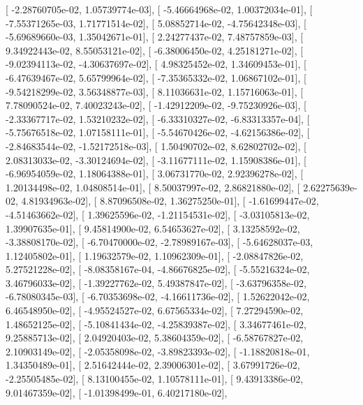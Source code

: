 \documentclass{article}
\begin{document}
       [ -2.28760705e-02,   1.05739774e-03],
       [ -5.46664968e-02,   1.00372034e-01],
       [ -7.55371265e-03,   1.71771514e-02],
       [  5.08852714e-02,  -4.75642348e-03],
       [ -5.69689660e-03,   1.35042671e-01],
       [  2.24277437e-02,   7.48757859e-03],
       [  9.34922443e-02,   8.55053121e-02],
       [ -6.38006450e-02,   4.25181271e-02],
       [ -9.02394113e-02,  -4.30637697e-02],
       [  4.98325452e-02,   1.34609453e-01],
       [ -6.47639467e-02,   5.65799964e-02],
       [ -7.35365332e-02,   1.06867102e-01],
       [ -9.54218299e-02,   3.56348877e-03],
       [  8.11036631e-02,   1.15716063e-01],
       [  7.78090524e-02,   7.40023243e-02],
       [ -1.42912209e-02,  -9.75230926e-03],
       [ -2.33367717e-02,   1.53210232e-02],
       [ -6.33310327e-02,  -6.83313357e-04],
       [ -5.75676518e-02,   1.07158111e-01],
       [ -5.54670426e-02,  -4.62156386e-02],
       [ -2.84683544e-02,  -1.52172518e-03],
       [  1.50490702e-02,   8.62802702e-02],
       [  2.08313033e-02,  -3.30124694e-02],
       [ -3.11677111e-02,   1.15908386e-01],
       [ -6.96954059e-02,   1.18064388e-01],
       [  3.06731770e-02,   2.92396278e-02],
       [  1.20134498e-02,   1.04808514e-01],
       [  8.50037997e-02,   2.86821880e-02],
       [  2.62275639e-02,   4.81934963e-02],
       [  8.87096508e-02,   1.36275250e-01],
       [ -1.61699447e-02,  -4.51463662e-02],
       [  1.39625596e-02,  -1.21154531e-02],
       [ -3.03105813e-02,   1.39907635e-01],
       [  9.45814900e-02,   6.54653627e-02],
       [  3.13258592e-02,  -3.38808170e-02],
       [ -6.70470000e-02,  -2.78989167e-03],
       [ -5.64628037e-03,   1.12405802e-01],
       [  1.19632579e-02,   1.10962309e-01],
       [ -2.08847826e-02,   5.27521228e-02],
       [ -8.08358167e-04,  -4.86676825e-02],
       [ -5.55216324e-02,   3.46796033e-02],
       [ -1.39227762e-02,   5.49387847e-02],
       [ -3.63796358e-02,  -6.78080345e-03],
       [ -6.70353698e-02,  -4.16611736e-02],
       [  1.52622042e-02,   6.46548950e-02],
       [ -4.95524527e-02,   6.67565334e-02],
       [  7.27294590e-02,   1.48652125e-02],
       [ -5.10841434e-02,  -4.25839387e-02],
       [  3.34677461e-02,   9.25885713e-02],
       [  2.04920403e-02,   5.38604359e-02],
       [ -6.58767827e-02,   2.10903149e-02],
       [ -2.05358098e-02,  -3.89823393e-02],
       [ -1.18820818e-01,   1.34350489e-01],
       [  2.51642444e-02,   2.39006301e-02],
       [  3.67991726e-02,  -2.25505485e-02],
       [  8.13100455e-02,   1.10578111e-01],
       [  9.43913386e-02,   9.01467359e-02],
       [ -1.01398499e-01,   6.40217180e-02],
\end{document}
